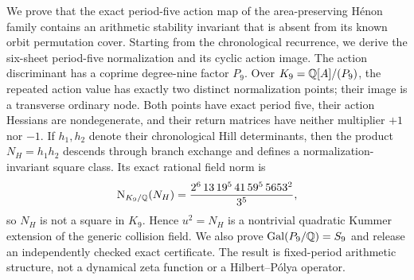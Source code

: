 We prove that the exact period-five action map of the area-preserving H\'enon
family contains an arithmetic stability invariant that is absent from its
known orbit permutation cover.  Starting from the chronological recurrence,
we derive the six-sheet period-five normalization and its cyclic action
image.  The action discriminant has a coprime degree-nine factor \(P_9\).
Over \(K_9=\mathbb{Q}[A]/(P_9)\), the repeated action value has exactly two distinct
normalization points; their image is a transverse ordinary node.  Both
points have exact period five, their action Hessians are nondegenerate, and
their return matrices have neither multiplier \(+1\) nor \(-1\).  If
\(h_1,h_2\) denote their chronological Hill determinants, then the product
\(N_H=h_1h_2\) descends through branch exchange and defines a
normalization-invariant square class.  Its exact rational field norm is
\[
\operatorname{N}_{K_9/\mathbb{Q}}(N_H)
=\frac{2^6\,13\,19^5\,41\,59^5\,5653^2}{3^5},
\]
so \(N_H\) is not a square in \(K_9\).  Hence \(u^2=N_H\) is a nontrivial
quadratic Kummer extension of the generic collision field.  We also prove
\(\operatorname{Gal}(P_9/\mathbb{Q})=S_9\) and release an independently checked exact
certificate.  The result is fixed-period arithmetic structure, not a
dynamical zeta function or a Hilbert--P\'olya operator.
